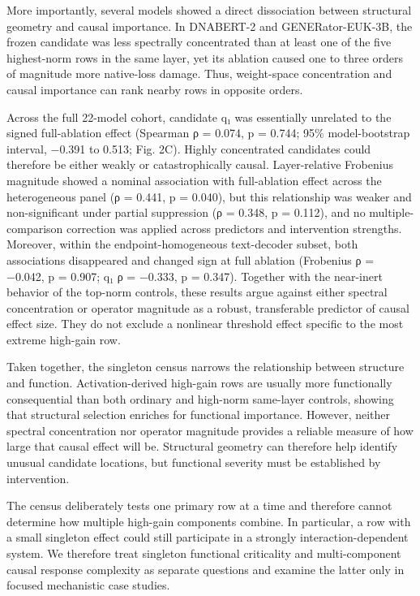 \documentclass[11pt]{article}
\begin{document}
More importantly, several models showed a direct dissociation between structural geometry and causal importance. In DNABERT-2 and GENERator-EUK-3B, the frozen candidate was less spectrally concentrated than at least one of the five highest-norm rows in the same layer, yet its ablation caused one to three orders of magnitude more native-loss damage. Thus, weight-space concentration and causal importance can rank nearby rows in opposite orders.

Across the full 22-model cohort, candidate q₁ was essentially unrelated to the signed full-ablation effect (Spearman ρ = 0.074, p = 0.744; 95\% model-bootstrap interval, −0.391 to 0.513; Fig. 2C). Highly concentrated candidates could therefore be either weakly or catastrophically causal. Layer-relative Frobenius magnitude showed a nominal association with full-ablation effect across the heterogeneous panel (ρ = 0.441, p = 0.040), but this relationship was weaker and non-significant under partial suppression (ρ = 0.348, p = 0.112), and no multiple-comparison correction was applied across predictors and intervention strengths. Moreover, within the endpoint-homogeneous text-decoder subset, both associations disappeared and changed sign at full ablation (Frobenius ρ = −0.042, p = 0.907; q₁ ρ = −0.333, p = 0.347). Together with the near-inert behavior of the top-norm controls, these results argue against either spectral concentration or operator magnitude as a robust, transferable predictor of causal effect size. They do not exclude a nonlinear threshold effect specific to the most extreme high-gain row.

Taken together, the singleton census narrows the relationship between structure and function. Activation-derived high-gain rows are usually more functionally consequential than both ordinary and high-norm same-layer controls, showing that structural selection enriches for functional importance. However, neither spectral concentration nor operator magnitude provides a reliable measure of how large that causal effect will be. Structural geometry can therefore help identify unusual candidate locations, but functional severity must be established by intervention.

The census deliberately tests one primary row at a time and therefore cannot determine how multiple high-gain components combine. In particular, a row with a small singleton effect could still participate in a strongly interaction-dependent system. We therefore treat singleton functional criticality and multi-component causal response complexity as separate questions and examine the latter only in focused mechanistic case studies.
\end{document}
